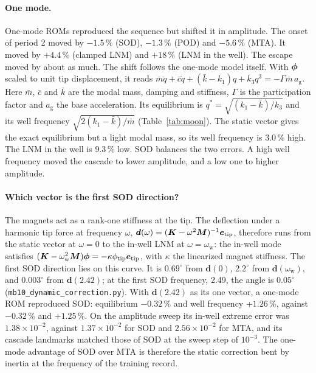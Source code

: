\documentclass[preprint,12pt]{elsarticle}
\begin{document}
\paragraph{One mode.} One-mode ROMs reproduced the sequence but shifted it in amplitude. The onset of period 2 moved by $-1.5\,\%$ (SOD), $-1.3\,\%$ (POD) and $-5.6\,\%$ (MTA). It moved by $+4.4\,\%$ (clamped LNM) and $+18\,\%$ (LNM in the well). The escape moved by about as much. The shift follows the one-mode model itself. With $\bm{\phi}$ scaled to unit tip displacement, it reads $\bar m\ddot q+\bar c\dot q+(\bar k-k_1)q+k_3q^3=-\varGamma\bar m\,a_{\mathrm g}$. Here $\bar m$, $\bar c$ and $\bar k$ are the modal mass, damping and stiffness, $\varGamma$ is the participation factor and $a_{\mathrm g}$ the base acceleration. Its equilibrium is $q^*=\sqrt{(k_1-\bar k)/k_3}$ and its well frequency $\sqrt{2(k_1-\bar k)/\bar m}$ (Table~\ref{tab:moon}). The static vector gives the exact equilibrium but a light modal mass, so its well frequency is 3.0\,\% high. The LNM in the well is 9.3\,\% low. SOD balances the two errors. A high well frequency moved the cascade to lower amplitude, and a low one to higher amplitude.


\paragraph{Which vector is the first SOD direction?} The magnets act as a rank-one stiffness at the tip. The deflection under a harmonic tip force at frequency $\omega$, $\bm{d}(\omega)=(\bm{K}-\omega^2\bm{M})^{-1}\bm{e}_{\mathrm{tip}}$, therefore runs from the static vector at $\omega=0$ to the in-well LNM at $\omega=\omega_{\mathrm w}$: the in-well mode satisfies $(\bm{K}-\omega_{\mathrm w}^2\bm{M})\bm{\phi}=-\kappa\phi_{\mathrm{tip}}\bm{e}_{\mathrm{tip}}$, with $\kappa$ the linearized magnet stiffness. The first SOD direction lies on this curve. It is $0.69^\circ$ from $\bm{d}(0)$, $2.2^\circ$ from $\bm{d}(\omega_{\mathrm w})$, and $0.003^\circ$ from $\bm{d}(2.42)$; at the first SOD frequency, 2.49, the angle is $0.05^\circ$ (\texttt{mb10\_dynamic\_correction.py}). With $\bm{d}(2.42)$ as its one vector, a one-mode ROM reproduced SOD: equilibrium $-0.32\,\%$ and well frequency $+1.26\,\%$, against $-0.32\,\%$ and $+1.25\,\%$. On the amplitude sweep its in-well extreme error was $1.38\times10^{-2}$, against $1.37\times10^{-2}$ for SOD and $2.56\times10^{-2}$ for MTA, and its cascade landmarks matched those of SOD at the sweep step of $10^{-3}$. The one-mode advantage of SOD over MTA is therefore the static correction bent by inertia at the frequency of the training record.
\end{document}
